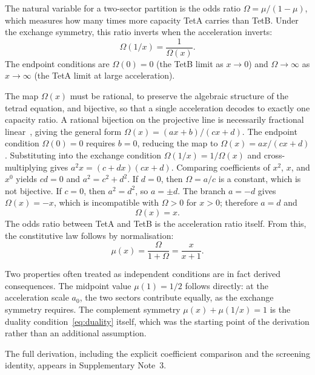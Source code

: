 \documentclass[twocolumn]{iopjournal}
\begin{document}
The natural variable for a two-sector partition is the odds
ratio $\Omega = \mu/(1-\mu)$, which measures how many times
more capacity TetA carries than TetB. Under the exchange
symmetry, this ratio inverts when the acceleration inverts:
\begin{equation}
  \Omega(1/x) = \frac{1}{\Omega(x)}.
  \label{eq:odds_duality}
\end{equation}
The endpoint conditions are $\Omega(0) = 0$ (the TetB limit as
$x \to 0$) and $\Omega \to \infty$ as $x \to \infty$
(the TetA limit at large acceleration).

The map $\Omega(x)$ must be rational, to preserve the algebraic
structure of the tetrad equation, and bijective, so that a
single acceleration decodes to exactly one capacity ratio. A
rational bijection on the projective line is necessarily
fractional linear~\cite{Hartshorne1977}, giving the general
form $\Omega(x) = (ax + b)/(cx + d)$. The endpoint condition
$\Omega(0) = 0$ requires $b = 0$, reducing the map to
$\Omega(x) = ax/(cx + d)$. Substituting into the exchange
condition $\Omega(1/x) = 1/\Omega(x)$ and cross-multiplying
gives $a^2 x = (c + dx)(cx + d)$. Comparing coefficients of
$x^2$, $x$, and $x^0$ yields $cd = 0$ and $a^2 = c^2 + d^2$.
If $d = 0$, then $\Omega = a/c$ is a constant, which is not
bijective. If $c = 0$, then $a^2 = d^2$, so $a = \pm d$.
The branch $a = -d$ gives $\Omega(x) = -x$, which is
incompatible with $\Omega > 0$ for $x > 0$; therefore $a = d$
and
\begin{equation}
  \Omega(x) = x.
  \label{eq:odds_result}
\end{equation}
The odds ratio between TetA and TetB is the acceleration ratio
itself. From this, the constitutive law follows by
normalisation:
\begin{equation}
  \mu(x) = \frac{\Omega}{1 + \Omega} = \frac{x}{x + 1}.
  \label{eq:mu_exchange}
\end{equation}

Two properties often treated as independent conditions are in
fact derived consequences. The midpoint value $\mu(1) = 1/2$
follows directly: at the acceleration scale $a_0$, the two
sectors contribute equally, as the exchange symmetry requires.
The complement symmetry $\mu(x) + \mu(1/x) = 1$ is the
duality condition~\eqref{eq:duality} itself, which was the
starting point of the derivation rather than an additional
assumption.

The full derivation, including the explicit coefficient
comparison and the screening identity, appears in
Supplementary Note~3.
\end{document}
